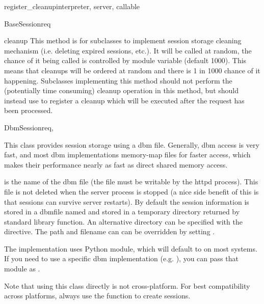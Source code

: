 \begin{funcdesc}{register_cleanup}{interpreter, server, callable}
\begin{classdesc}{BaseSession}{req}
  \begin{methoddesc}[BaseSession]{cleanup}{}
    This method is for subclasses to implement session storage
    cleaning mechanism (i.e. deleting expired sessions, etc.). It will
    be called at random, the chance of it being called is controlled
    by   module variable
    (default 1000). This means that cleanups will be ordered at random
    and there is 1 in 1000 chance of it happening. Subclasses
    implementing this method should not perform the (potentially time
    consuming) cleanup operation in this method, but should instead
    use  to register a cleanup which will
    be executed after the request has been processed.
  \end{methoddesc}

\end{classdesc}

\begin{classdesc}{DbmSession}{req, }

  This class provides session storage using a dbm file. Generally, dbm
  access is very fast, and most dbm implementations memory-map files
  for faster access, which makes their performance nearly as fast as
  direct shared memory access.

   is the name of the dbm file (the file must be writable by
  the httpd process). This file is not deleted when the server process
  is stopped (a nice side benefit of this is that sessions can survive
  server restarts). By default the session information is stored in a
  dbmfile named  and stored in a temporary directory
  returned by  standard library
  function. An alternative directory can be specified with the  
   directive.  
  The path and filename can can be overridden by setting .

  The implementation uses Python  module, which will
  default to  on most systems. If you need to use a
  specific dbm implementation (e.g. ), you can pass that
  module as .

  Note that using this class directly is not cross-platform. For best
  compatibility across platforms, always use the 
  function to create sessions.

\end{classdesc}


\end{funcdesc}
